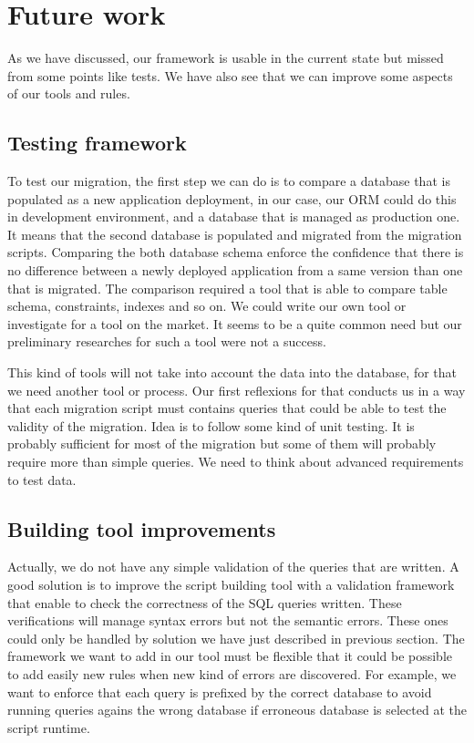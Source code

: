\section{Future work}

As we have discussed, our framework is usable in the current state but missed from some points like tests. We have also see that we can improve some aspects of our tools and rules.

\subsection{Testing framework}

To test our migration, the first step we can do is to compare a database that is populated as a new application deployment, in our case, our ORM could do this in development environment, and a database that is managed as production one. It means that the second database is populated and migrated from the migration scripts. Comparing the both database schema enforce the confidence that there is no difference between a newly deployed application from a same version than one that is migrated. The comparison required a tool that is able to compare table schema, constraints, indexes and so on. We could write our own tool or investigate for a tool on the market. It seems to be a quite common need but our preliminary researches for such a tool were not a success.

This kind of tools will not take into account the data into the database, for that we need another tool or process. Our first reflexions for that conducts us in a way that each migration script must contains queries that could be able to test the validity of the migration. Idea is to follow some kind of unit testing. It is probably sufficient for most of the migration but some of them will probably require more than simple queries. We need to think about advanced requirements to test data.

\subsection{Building tool improvements}

Actually, we do not have any simple validation of the queries that are written. A good solution is to improve the script building tool with a validation framework that enable to check the correctness of the SQL queries written. These verifications will manage syntax errors but not the semantic errors. These ones could only be handled by solution we have just described in previous section. The framework we want to add in our tool must be flexible that it could be possible to add easily new rules when new kind of errors are discovered. For example, we want to enforce that each query is prefixed by the correct database to avoid running queries agains the wrong database if erroneous database is selected at the script runtime.

